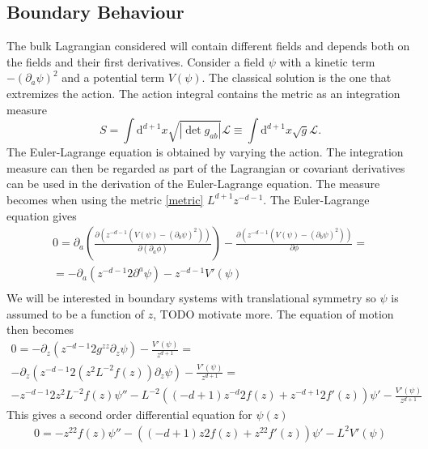 \documentclass[12pt]{article}
\renewcommand{\d}{\ensuremath{\mathrm{d}}}
\renewcommand{\L}{\ensuremath{\mathcal{L}}}
\begin{document}
\subsection{Boundary Behaviour}
The bulk Lagrangian considered will contain different fields and depends both on the fields and their first derivatives. Consider a field $\psi$ with a kinetic term $-(\partial_a\psi)^2$ and a potential term $V(\psi)$. The classical solution is the one that extremizes the action. The action integral contains the metric as an integration measure
\begin{equation}
 S=\int\d^{d+1} x\sqrt{|\det g_{ab}|}\L\equiv\int\d^{d+1} x\sqrt{g}\L.
\end{equation}
The Euler-Lagrange equation is obtained by varying the action. The integration measure can then be regarded as part of the Lagrangian or covariant derivatives can be used in the derivation of the Euler-Lagrange equation. The measure becomes when using the metric \eqref{metric} $L^{d+1}z^{-d-1}$. The Euler-Lagrange equation gives
\begin{equation}
\begin{split}
 0=\partial_a\left(\frac{\partial (z^{-d-1}(V(\psi)-(\partial_b\psi)^2)) }{\partial(\partial_a\phi)}\right)-\frac{\partial  (z^{-d-1}(V(\psi)-(\partial_b\psi)^2) )}{\partial\phi}=\\
 =-\partial_a\left(z^{-d-1}2\partial^a\psi\right)-z^{-d-1}V'(\psi)\\
\end{split}
\end{equation}
We will be interested in boundary systems with translational symmetry so $\psi$ is assumed to be a function of $z$, TODO motivate more. The equation of motion then becomes
\begin{equation}
\begin{split}
0=-\partial_z\left(z^{-d-1}2g^{zz}\partial_z\psi\right)  -\frac{V'(\psi)}{z^{d+1}}=\\
-\partial_z\left(z^{-d-1}2(z^2L^{-2}f(z))\partial_z\psi\right)  -\frac{V'(\psi)}{z^{d+1}}=\\
-z^{-d-1}2z^2L^{-2}f(z)\psi''-L^{-2}\left((-d+1)z^{-d}2f(z) + z^{-d+1}2f'(z)\right)\psi' -\frac{V'(\psi)}{z^{d+1}}
\end{split}
\end{equation}
This gives a second order differential equation for $\psi(z)$
\begin{equation}
\begin{split}
0=-z^22f(z)\psi''-\left((-d+1)z2f(z) + z^22f'(z)\right)\psi' -L^2V'(\psi)
\end{split}
\end{equation}
\end{document}
